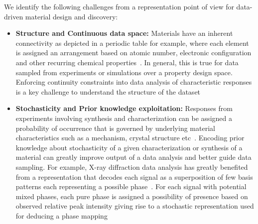 We identify the following challenges from a representation point of view for data-driven material design and discovery:
\begin{itemize}
    \item {\textbf{Structure and Continuous data space: }Materials have an inherent connectivity as depicted in a periodic table for example, where each element is assigned an arrangement based on atomic number, electronic configuration and other recurring chemical properties~\cite{periodictable}. In general, this is true for data sampled from experiments or simulations over a property design space. Enforcing continuity constraints into data analysis of characteristic responses is a key challenge to understand the structure of the dataset~\cite{lebras2011constraint}}
    \item {\textbf{Stochasticity and Prior knowledge exploitation:} Responses from experiments involving synthesis and characterization can be assigned a probability of occurrence that is governed by underlying material characteristics such as a mechanism, crystal structure etc~\cite{hull2018stochasticity}. Encoding prior knowledge about stochasticity of a given characterization or synthesis of a material can greatly improve output of a data analysis and better guide data sampling.  For example, X-ray diffraction data analysis has greatly benefited from a representation that decodes each signal as a superposition of few basis patterns each representing a possible phase~\cite{Kusne2015HighthroughputDO,hattrick2016perspective}. For each signal with potential mixed phases, each pure phase is assigned a possibility of presence based on observed relative peak intensity giving rise to a stochastic representation used for deducing a phase mapping~\cite{gomes2019crystal,stanev2018unsupervised}}
\end{itemize}


